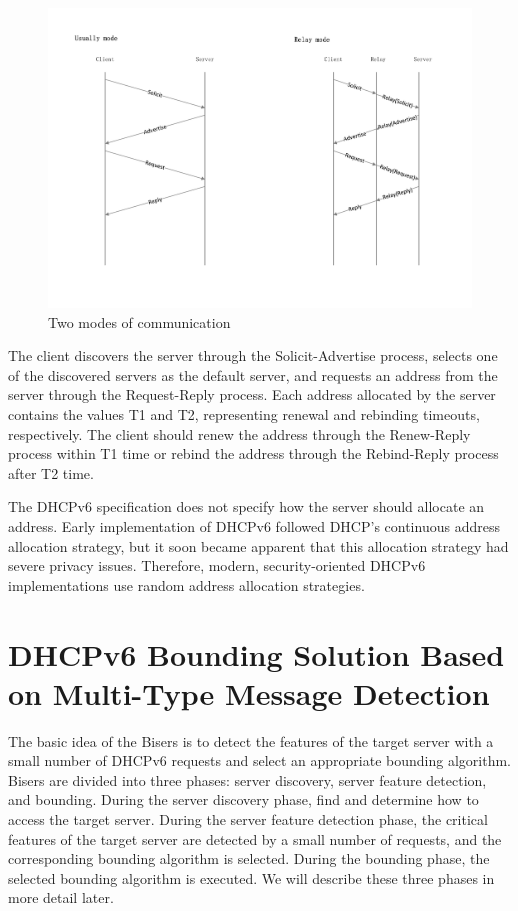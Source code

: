 \documentclass[conference]{IEEEtran}
\begin{document}
\begin{figure}[tbp]
  \centerline{\includegraphics[scale=0.3]{relay.pdf}}
  \caption{Two modes of communication}
  \label{figRelay}
\end{figure}

The client discovers the server through the Solicit-Advertise process,
selects one of the discovered servers as the default server, and
requests an address from the server through the Request-Reply
process. Each address allocated by the server contains the values T1
and T2, representing renewal and rebinding timeouts, respectively. The
client should renew the address through the Renew-Reply process within
T1 time or rebind the address through the Rebind-Reply process after
T2 time.

The DHCPv6 specification does not specify how the server should
allocate an address. Early implementation of DHCPv6 followed DHCP's
continuous address allocation strategy, but it soon became apparent
that this allocation strategy had severe privacy issues. Therefore,
modern, security-oriented DHCPv6 implementations use random address
allocation strategies.

\section{DHCPv6 Bounding Solution Based on Multi-Type Message Detection}

The basic idea of the Bisers is to detect the features of the target
server with a small number of DHCPv6 requests and select an
appropriate bounding algorithm. Bisers are divided into three phases:
server discovery, server feature detection, and bounding. During the
server discovery phase, find and determine how to access the target
server. During the server feature detection phase, the critical
features of the target server are detected by a small number of
requests, and the corresponding bounding algorithm is selected. During
the bounding phase, the selected bounding algorithm is executed. We
will describe these three phases in more detail later.
\end{document}

